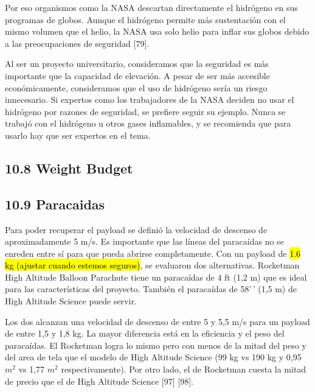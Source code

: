 \documentclass[12pt,a4paper]{article}
\begin{document}
Por eso organismos como la NASA descartan directamente el hidrógeno en sus programas de globos. Aunque el hidrógeno permite más sustentación con el mismo volumen que el helio, la NASA usa solo helio para inflar sus globos debido a las preocupaciones de seguridad {[}79{]}.

Al ser un proyecto universitario, consideramos que la seguridad es más importante que la capacidad de elevación. A pesar de ser más accesible económicamente, consideramos que el uso de hidrógeno sería un riesgo innecesario. Si expertos como los trabajadores de la NASA deciden no usar el hidrógeno por razones de seguridad, se prefiere seguir su ejemplo. Nunca se trabajó con el hidrógeno u otros gases inflamables, y se recomienda que para usarlo hay que ser expertos en el tema.

\subsection{10.8 Weight Budget}\label{weight-budget}

\subsection{10.9 Paracaidas}\label{paracaidas}

Para poder recuperar el payload se definió la velocidad de descenso de aproximadamente 5 m/s. Es importante que las líneas del paracaídas no se enreden entre sí para que pueda abrirse completamente. Con un payload de \hl{1.6 kg (ajustar cuando estemos seguros)}, se evaluaron dos alternativas. Rocketman High Altitude Balloon Parachute tiene un paracaídas de 4 ft (1,2 m) que es ideal para las características del proyecto. También el paracaídas de 58'\,' (1,5 m) de High Altitude Science puede servir.

Los dos alcanzan una velocidad de descenso de entre 5 y 5,5 m/s para un payload de entre 1,5 y 1,8 kg. La mayor diferencia está en la eficiencia y el peso del paracaídas. El Rocketman logra lo mismo pero con menos de la mitad del peso y del area de tela que el modelo de High Altitude Science (99 kg vs 190 kg y 0,95 \(m^{2}\) vs 1,77 \(m^{2}\) respectivamente). Por otro lado, el de Rocketman cuesta la mitad de precio que el de High Altitude Science {[}97{]} {[}98{]}.
\end{document}
